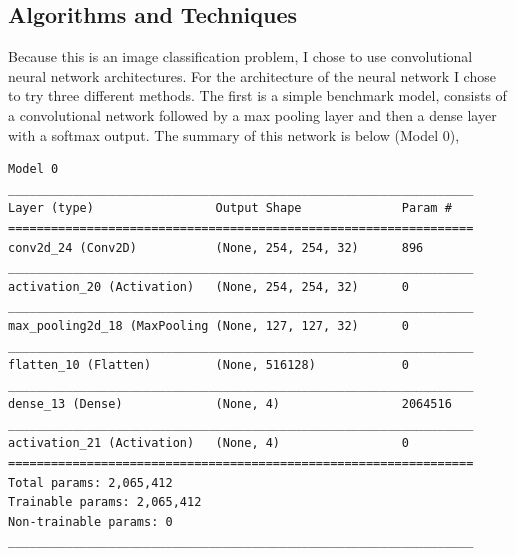 \documentclass[10pt,a4paper]{article}
\begin{document}
\subsection{Algorithms and Techniques}
%
Because this is an image classification problem, I chose to use convolutional neural network architectures. 
For the architecture of the neural network I chose to try three different methods. The first is a simple benchmark model, consists of a convolutional network followed by a max pooling layer and then a dense layer with a softmax output. The summary of this network is below (Model 0),\\
\begin{lstlisting}
Model 0
_________________________________________________________________
Layer (type)                 Output Shape              Param #   
=================================================================
conv2d_24 (Conv2D)           (None, 254, 254, 32)      896       
_________________________________________________________________
activation_20 (Activation)   (None, 254, 254, 32)      0         
_________________________________________________________________
max_pooling2d_18 (MaxPooling (None, 127, 127, 32)      0         
_________________________________________________________________
flatten_10 (Flatten)         (None, 516128)            0         
_________________________________________________________________
dense_13 (Dense)             (None, 4)                 2064516   
_________________________________________________________________
activation_21 (Activation)   (None, 4)                 0         
=================================================================
Total params: 2,065,412
Trainable params: 2,065,412
Non-trainable params: 0
_________________________________________________________________
\end{lstlisting}
\end{document}
